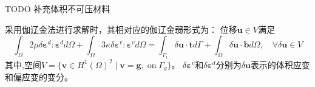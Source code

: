 TODO
补充体积不可压材料

采用伽辽金法进行求解时，其相对应的伽辽金弱形式为：
位移$\boldsymbol u \in V$满足
\begin{equation}\label{weak_penalty}
\int_\Omega 2\mu \delta \boldsymbol \varepsilon^d : \boldsymbol \varepsilon^d d\Omega +
\int_\Omega 3\kappa \delta \boldsymbol \varepsilon^v : \boldsymbol \varepsilon^v d\Omega =
\int_{\Gamma_t} \delta \boldsymbol u \cdot \boldsymbol t d\Gamma + \int_\Omega \delta \boldsymbol u \cdot \boldsymbol b d\Omega, \quad
\forall \delta \boldsymbol u \in V
\end{equation}
其中,空间$V=\{\boldsymbol v \in H^1(\Omega)^2\;\vert\;\boldsymbol v = \boldsymbol g, \; \textrm{on} \; \Gamma_g\}$。
$\delta\boldsymbol \varepsilon^v$和$\delta\boldsymbol \varepsilon^d $分别为$\delta \boldsymbol u$表示的体积应变和偏应变的变分。

